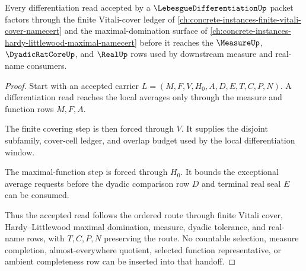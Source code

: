 \begin{theorem}
\label{thm:lebesgue-differentiation-vitali-maximal-handoff}
Every differentiation read accepted by a $\LebesgueDifferentiationUp$ packet factors through the finite Vitali-cover ledger of \autoref{ch:concrete-instances-finite-vitali-cover-namecert} and the maximal-domination surface of \autoref{ch:concrete-instances-hardy-littlewood-maximal-namecert} before it reaches the $\MeasureUp$, $\DyadicRatCoreUp$, and $\RealUp$ rows used by downstream measure and real-name consumers.
\end{theorem}
\begin{proof}
Start with an accepted carrier $L=(M,F,V,H_0,A,D,E,T,C,P,N)$. A differentiation read reaches the local averages only through the measure and function rows $M,F,A$.

The finite covering step is then forced through $V$. It supplies the disjoint subfamily, cover-cell ledger, and overlap budget used by the local differentiation window.

The maximal-function step is forced through $H_0$. It bounds the exceptional average requests before the dyadic comparison row $D$ and terminal real seal $E$ can be consumed.

Thus the accepted read follows the ordered route through finite Vitali cover, Hardy--Littlewood maximal domination, measure, dyadic tolerance, and real-name rows, with $T,C,P,N$ preserving the route. No countable selection, measure completion, almost-everywhere quotient, selected function representative, or ambient completeness row can be inserted into that handoff.
\end{proof}


\begin{closurestatus}{\LebesgueDifferentiationUp}
  \theoryclosure{\seedClosure}
  \formalstatus{\unformalizedV}
\end{closurestatus}

